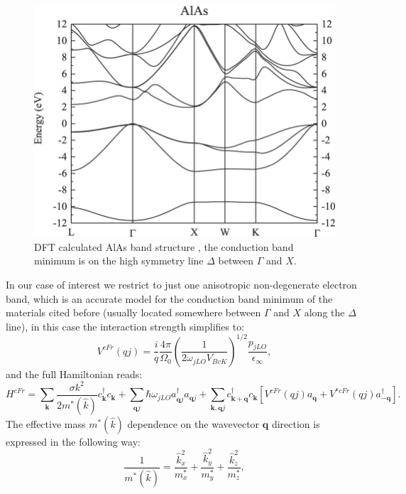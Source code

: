 \begin{figure}[H]
    \centering
    \includegraphics[scale=1.0]{Electronic-band-structure-for-AlAs.jpg}
    \caption{DFT calculated AlAs band structure \cite{da2021pseudopotential}, the conduction band minimum is on the high symmetry 
    line $\Delta$ between $\Gamma$ and $X$.}
    \label{fig:AlAs_bands}
\end{figure}
In our case of interest we restrict to just one anisotropic non-degenerate electron band, which is an accurate model for the conduction band minimum of 
the materials cited before (usually located somewhere between $\Gamma$ and $X$ along the $\Delta$ line), in this case the interaction 
strength simplifies to:
\begin{equation}
    V^{cFr}(qj)=\frac{i}{q}\frac{4\pi}{\Omega_0}\left(\frac{1}{2\omega_{jLO}V_{BvK}}\right)^{1/2}\frac{p_{jLO}}{\epsilon_\infty},
    \label{coupling_strength_anisotropic}
\end{equation}
and the full Hamiltonian reads:
\begin{equation}
    H^{cFr}=\sum_{\mathbf{k}}\frac{\sigma k^2}{2m^*(\hat{k})}c^\dagger_\mathbf{k}c_\mathbf{k}+\sum_{\mathbf{q}j}\hbar\omega_{jLO}a^\dagger_{\mathbf{q}j}a_{\mathbf{q}j}+\sum_{\mathbf{k},\mathbf{q}j}c^\dagger_{\mathbf{k}+\mathbf{q}}c_\mathbf{k}\left[V^{cFr}(qj)a_\mathbf{q}+V^{*cFr}(qj)a^\dagger_\mathbf{-q}\right].
    \label{Froehlich_cubic_k_anisotropic}
\end{equation}
The effective mass $m^*(\hat{k})$ dependence on the wavevector $\mathbf{q}$ direction is expressed in the following way:
\begin{equation}
    \frac{1}{m^*(\hat{k})}=\frac{\hat{k}_x^2}{m^*_x}+\frac{\hat{k}_y^2}{m^*_y}+\frac{\hat{k}_z^2}{m^*_z},
    \label{effective_mass_anisotropic_relation}
\end{equation}
